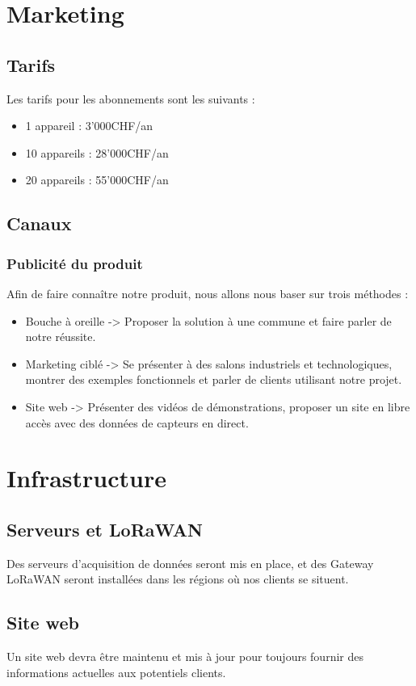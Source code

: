 \section{Marketing}
\subsection{Tarifs}
Les tarifs pour les abonnements sont les suivants :
\begin{itemize}
    \item 1 appareil : 3'000CHF/an
    \item 10 appareils : 28'000CHF/an
    \item 20 appareils : 55'000CHF/an
\end{itemize}

\subsection{Canaux}
\subsubsection{Publicité du produit}
Afin de faire connaître notre produit, nous allons nous baser sur trois
méthodes :
\begin{itemize}
    \item Bouche à oreille -> Proposer la solution à une commune
    et faire parler de notre réussite.
    \item Marketing ciblé -> Se présenter à des salons industriels
    et technologiques, montrer des exemples fonctionnels et parler de
    clients utilisant notre projet.
    \item Site web -> Présenter des vidéos de démonstrations,
    proposer un site en libre accès avec des données de capteurs en direct.
\end{itemize}

\section{Infrastructure}
\subsection{Serveurs et LoRaWAN}
Des serveurs d'acquisition de données seront mis en place,
et des Gateway LoRaWAN seront installées dans les régions où nos
clients se situent.

\subsection{Site web}
Un site web devra être maintenu et mis à jour pour toujours fournir
des informations actuelles aux potentiels clients.

